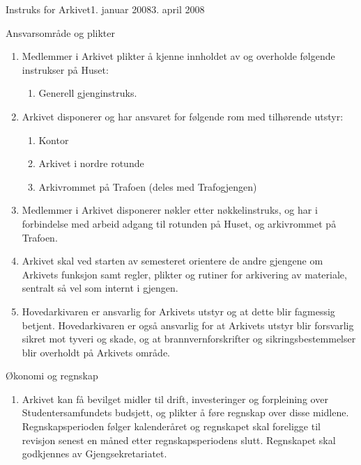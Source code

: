 \begin{instruks}{Instruks for Arkivet}{1. januar 2008}{3. april 2008}
    \begin{instruksledd}{Ansvarsområde og plikter}
        \begin{enumerate}
            \item Medlemmer i Arkivet plikter å kjenne innholdet av og overholde følgende instrukser
                på Huset:
                \begin{enumerate}
                    \item Generell gjenginstruks.
                \end{enumerate}
            \item Arkivet disponerer og har ansvaret for følgende rom med tilhørende utstyr:
                \begin{enumerate}
                    \item Kontor
                    \item Arkivet i nordre rotunde
                    \item Arkivrommet på Trafoen (deles med Trafogjengen)
                \end{enumerate}
            \item Medlemmer i Arkivet disponerer nøkler etter nøkkelinstruks, og har i forbindelse
                med arbeid adgang til rotunden på Huset, og arkivrommet på Trafoen.
            \item Arkivet skal ved starten av semesteret orientere de andre gjengene om Arkivets
                funksjon samt regler, plikter og rutiner for arkivering av materiale, sentralt så vel som internt i gjengen.
            \item Hovedarkivaren er ansvarlig for Arkivets utstyr og at dette blir fagmessig
                betjent. Hovedarkivaren er også ansvarlig for at Arkivets utstyr blir forsvarlig sikret mot tyveri og skade, og at
                brannvernforskrifter og sikringsbestemmelser blir overholdt på Arkivets område.
        \end{enumerate}
    \end{instruksledd}

    \begin{instruksledd}{Økonomi og regnskap}
        \begin{enumerate}
            \item Arkivet kan få bevilget midler til drift, investeringer og forpleining over
                Studentersamfundets budsjett, og plikter å føre regnskap over disse midlene. Regnskapsperioden følger kalenderåret og
                regnskapet skal foreligge til revisjon senest en måned etter regnskapsperiodens slutt. Regnskapet
                skal godkjennes av Gjengsekretariatet.
        \end{enumerate}
    \end{instruksledd}


\end{instruks}
